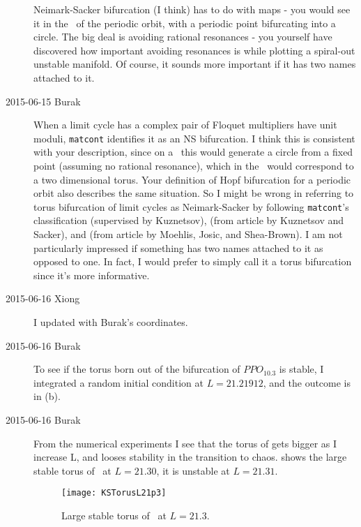 \begin{description}
Neimark-Sacker bifurcation (I think) has to do with maps - you would see
it in the \PoincSec\ of the periodic orbit, with a periodic point
bifurcating into a circle. The big deal is avoiding rational resonances - you
yourself have discovered how important avoiding resonances is while
plotting a spiral-out unstable manifold. Of
course, it sounds more important if it has two names attached to it.

                                                                    \inCB
\item[2015-06-15 Burak] When a limit cycle has a complex pair of
Floquet multipliers have unit moduli, \texttt{matcont}
identifies it as an NS bifurcation. I think this is consistent with
your description, since on a \PoincSec\ this would generate a
circle from a fixed point (assuming no rational resonance), which in
the \statesp\ would correspond to a two dimensional torus. Your
definition of Hopf bifurcation for a periodic orbit also describes the
same situation. So I might be wrong in referring to torus bifurcation
of limit cycles as Neimark-Sacker by following
\texttt{matcont}'s classification (supervised by Kuznetsov),
(from article by Kuznetsov and Sacker), and
(from article by Moehlis, Josic, and Shea-Brown).
I am not particularly impressed if something has two names attached to
it as opposed to one. In fact, I would prefer to simply call it a
torus bifurcation since it's more informative.

\item[2015-06-16 Xiong] I updated  with Burak's
coordinates.

\item[2015-06-16 Burak] To see if the torus born out of the bifurcation
of $PPO_{10.3}$ is stable, I integrated a random initial condition at
$L=21.21912$, and the outcome is in  (b).

\item[2015-06-16 Burak] From the numerical experiments I see that the
torus of  gets bigger as I increase L, and looses
stability in the transition to chaos.
 shows the large stable
torus of \KS\ at $L=21.30$, it is unstable at $L=21.31$.

\begin{figure}[ht]
\begin{center}
      \texttt{[image: KSTorusL21p3]}
\end{center}
    \caption[]{
       Large stable torus of \KSe\ at $L=21.3$.
    }
    \label{f-KSTorusL21p3}
\end{figure}


\end{description}
